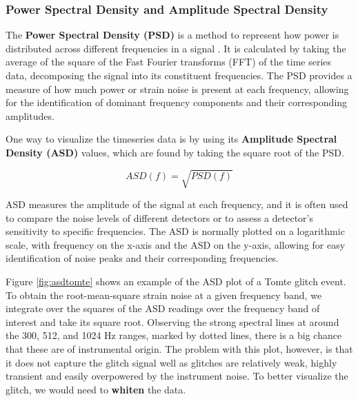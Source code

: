 \documentclass[12pt]{article}
\begin{document}
\subsubsection{Power Spectral Density and Amplitude Spectral Density}

\medskip
\noindent The \textbf{Power Spectral Density (PSD)} is a method to represent how power is distributed across different frequencies in a signal \cite{Oppenheim_2009, Li:2013lza}. It is calculated by taking the average of the square of the Fast Fourier transforms (FFT) of the time series data, decomposing the signal into its constituent frequencies. The PSD provides a measure of how much power or strain noise is present at each frequency, allowing for the identification of dominant frequency components and their corresponding amplitudes.

\medskip
\noindent One way to visualize the timeseries data is by using its \textbf{Amplitude Spectral Density (ASD)} values, which are found by taking the square root of the PSD.

\begin{equation}
    ASD(f) = \sqrt{PSD(f)}
    \label{eq:asd}
\end{equation}

\noindent ASD measures the amplitude of the signal at each frequency, and it is often used to compare the noise levels of different detectors or to assess a detector's sensitivity to specific frequencies. The ASD is normally plotted on a logarithmic scale, with frequency on the x-axis and the ASD on the y-axis, allowing for easy identification of noise peaks and their corresponding frequencies.

\medskip
\noindent Figure \ref{fig:asdtomte} shows an example of the ASD plot of a Tomte glitch event. To obtain the root-mean-square strain noise at a given frequency band, we integrate over the squares of the ASD readings over the frequency band of interest and take its square root. Observing the strong spectral lines at around the 300, 512, and 1024 Hz ranges, marked by dotted lines, there is a big chance that these are of instrumental origin. The problem with this plot, however, is that it does not capture the glitch signal well as glitches are relatively weak, highly transient and easily overpowered by the instrument noise. To better visualize the glitch, we would need to \textbf{whiten} the data.
\end{document}
